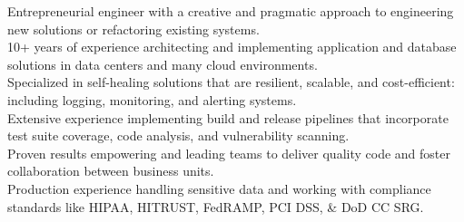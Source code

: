 

\begin{cvparagraph}

Entrepreneurial engineer with a creative and pragmatic approach to engineering new solutions or refactoring existing systems.
\\10+ years of experience architecting and implementing application and database solutions in data centers and many cloud environments.
\\Specialized in self-healing solutions that are resilient, scalable, and cost-efficient: including logging, monitoring, and alerting systems.
\\Extensive experience implementing build and release pipelines that incorporate test suite coverage, code analysis, and vulnerability scanning.
\\Proven results empowering and leading teams to deliver quality code and foster collaboration between business units.
\\Production experience handling sensitive data and working with compliance standards like HIPAA, HITRUST, FedRAMP, PCI DSS, \& DoD CC SRG.
\end{cvparagraph}
